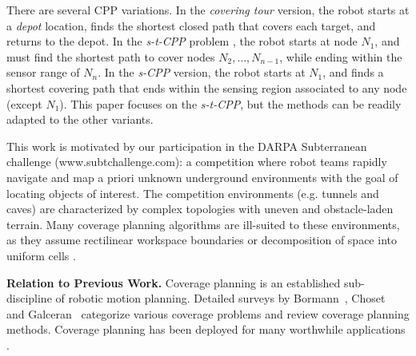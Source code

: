 \documentclass[letterpaper, 10 pt, conference]{ieeeconf}
\theoremstyle{definition}
\begin{document}
There are several CPP variations.  In the {\em covering tour} version, the robot starts at a {\em depot} location, finds the shortest closed path that covers each target, and returns to the depot.  In the {\em s-t-CPP} problem
\cite{hoogeveen_analysis_1991}, the robot starts at node $N_1$, and must find the shortest path to cover nodes $N_2,\ldots,N_{n-1}$, while ending within the sensor range of $N_n$. In the {\em s-CPP} version, the robot starts at $N_1$, and finds a shortest covering path that ends within the sensing region associated to any node (except $N_1$).  This paper focuses on the {\em s-t-CPP}, but the methods can be readily adapted to the other variants.

This work is motivated by our participation \cite{AutoSpot} in the DARPA Subterranean challenge (www.subtchallenge.com): a  competition where robot teams rapidly navigate and map a priori unknown underground environments with the goal of locating objects of interest. The competition environments (e.g. tunnels and caves) are characterized by complex topologies with uneven and obstacle-laden terrain. Many coverage planning algorithms are ill-suited to these environments, as they assume rectilinear workspace boundaries or decomposition of space into uniform cells \cite{joon_seop_oh_complete_2004,gonzalez_bsa:_2005}. 


{\bf Relation to Previous Work.}  Coverage planning is an established sub-discipline of robotic motion planning. Detailed surveys by Bormann~\cite{bormann_indoor_2018}, Choset ~\cite{choset_coverage_2001} and Galceran~\cite{galceran_survey} categorize various coverage problems and review coverage planning methods.  Coverage planning has been deployed for many worthwhile applications \cite{?,?}. 
\end{document}
